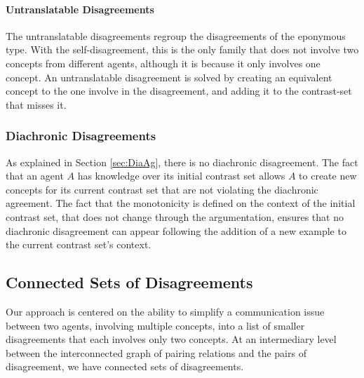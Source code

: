 \paragraph{Untranslatable Disagreements} The untranslatable disagreements regroup the disagreements of the eponymous type. With the self-disagreement, this is the only family that does not involve two concepts from different agents, although it is because it only involves one concept. An untranslatable disagreement is solved by creating an equivalent concept to the one involve in the disagreement, and adding it to the contrast-set that misses it.


\subsubsection{Diachronic Disagreements}\label{sec:DiaD}

As explained in Section \ref{sec:DiaAg}, there is no diachronic disagreement. The fact that an agent $A$ has knowledge over its initial contrast set allows $A$ to create new concepts for its current contrast set that are not violating the diachronic agreement. The fact that the monotonicity is defined on the context of the initial contrast set, that does not change through the argumentation, ensures that no diachronic disagreement can appear following the addition of a new example to the current contrast set's context.

\subsection{Connected Sets of Disagreements}
\label{sec:SystemDisagreement}

Our approach is centered on the ability to simplify a communication issue between two agents, involving multiple concepts, into a list of smaller disagreements that each involves only two concepts. At an intermediary level between the interconnected graph of pairing relations and the pairs of disagreement, we have connected sets of disagreements.

